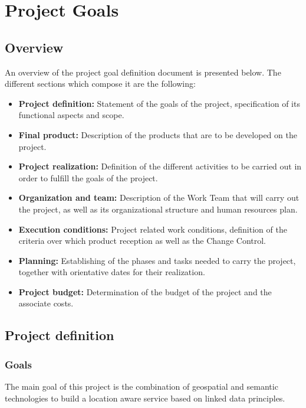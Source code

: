 \chapter{Project Goals}\label{ch:goals}

\section{Overview}

An overview of the project goal definition document is presented below. The different sections which compose it are the following:

\begin{itemize}
\item \textbf{Project definition:} Statement of the goals of the project, specification of its functional aspects and scope.
\item \textbf{Final product:} Description of the products that are to be developed on the project.
\item \textbf{Project realization:} Definition of the different activities to be carried out in order to fulfill the goals of the project.
\item \textbf{Organization and team:} Description of the Work Team that will carry out the project, as well as its organizational structure and human resources plan.
\item \textbf{Execution conditions:} Project related work conditions, definition of the criteria over which product reception as well as the Change Control.
\item \textbf{Planning:} Establishing of the phases and tasks needed to carry the project, together with orientative dates for their realization.
\item \textbf{Project budget:} Determination of the budget of the project and the associate costs.
\end{itemize}

\section{Project definition}

\subsection{Goals}\label{sec:goals}

The main goal of this project is the combination of geospatial and semantic technologies to build a location aware service based on linked data principles.


